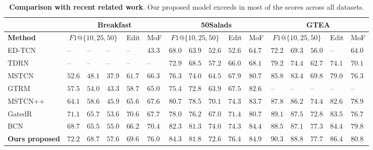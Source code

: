 \documentclass[10pt,twocolumn,letterpaper]{article}
\begin{document}
\begin{table*}[t]
\begin{center}
\small{
\begin{tabular}{p{2.3cm} | p{0.5cm}p{0.5cm}p{0.5cm}p{0.6cm}p{0.6cm} | p{0.5cm}p{0.5cm}p{0.5cm}p{0.6cm}p{0.6cm} | p{0.5cm}p{0.5cm}p{0.5cm}p{0.6cm}p{0.6cm}}
\hline
& \multicolumn{5}{c|}{Breakfast} & \multicolumn{5}{c|}{50Salads} & \multicolumn{5}{c}{GTEA}\\
\hline
\textbf{Method} & \multicolumn{3}{c}{$F1@\{10,25,50\}$} & Edit & MoF & \multicolumn{3}{c}{$F1@\{10,25,50\}$} & Edit & MoF & \multicolumn{3}{c}{$F1@\{10,25,50\}$} & Edit & MoF\\
\hline\hline
ED-TCN\cite{TED-lea2017temporal} & -- & -- & -- & -- & $43.3$ & $68.0$ & $63.9$ & $52.6$ & $52.6$ & $64.7$ & $72.2$ & $69.3$ & $56.0$ & -- & $64.0$\\
TDRN\cite{TEDresi-lei2018temporal} & -- & -- & -- & -- & -- & $72.9$ & $68.5$ & $57.2$ & $66.0$ & $68.1$ & $79.2$ & $74.4$ & $62.7$  & $74.1$  & $70.1$ \\
MSTCN\cite{farha2019ms} & $52.6$ & $48.1$ & $37.9$ & $61.7$ & $66.3$ & $76.3$ & $74.0$ & $64.5$ & $67.9$ & $80.7$  & $85.8$ & $83.4$ & $69.8$ & $79.0$ & $76.3$\\
GTRM\cite{huang2020improving} & $57.5$ & $54.0$ & $43.3$ & $58.7$ & $65.0$ & $75.4$ & $72.8$ & $63.9$ & $67.5$ & $82.6$  & -- & -- & -- & -- & -- \\

MSTCN++\cite{li2020ms} & $64.1$ & $58.6$ & $45.9$ & $65.6$ & $67.6$ & $80.7$ & $78.5$ & $70.1$ & $74.3$ & $83.7$ & $87.8$ & $86.2$ & $74.4$ & $82.6$ & $78.9$\\
GatedR\cite{wang2020gated} & $71.1$ & $65.7$ & $53.6$ & $\mathbf{70.6}$ & $67.7$ & $78.0$ & $76.2$ & $67.0$ & $71.4$ & $80.7$ & $89.1$ & $87.5$ & $72.8$ & $83.5$ & $76.7$ \\
BCN\cite{wang2020boundary} & $68.7$	& $65.5$ & $55.0$ & $66.2$ & $70.4$ & $82.3$ & $81.3$ & $\mathbf{74.0}$ & $74.3$ & $84.4$ & $88.5$ & $87.1$ & $77.3$ &	$84.4$ & $79.8$\\
\hline
\textbf{Ours proposed} & $\mathbf{72.2}$ & $\mathbf{68.7}$ & $\mathbf{57.6}$ & $69.6$ & $\mathbf{76.0}$ & $\mathbf{84.3}$ & $\mathbf{81.8}$ & $72.6$ & $\mathbf{76.4}$ & $\mathbf{84.9}$ & $\mathbf{90.3}$ & $\mathbf{88.8}$ & $\mathbf{77.7}$ & $\mathbf{86.4}$ & $\mathbf{80.8}$ \\
\hline\hline
\end{tabular}
}
\end{center}
\caption{\textbf{Comparison with recent related work}. Our proposed model exceeds in most of the scores across all datasets.}\label{tab:final result}
\end{table*}
\end{document}
